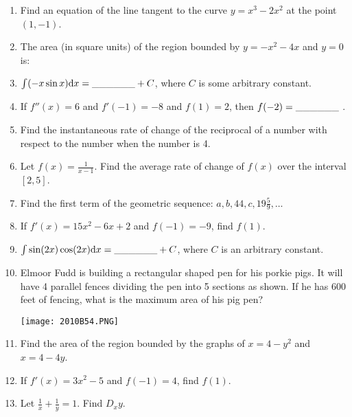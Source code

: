 \documentclass[../uilmath.tex]{subfiles}
\begin{document}
\begin{enumerate}[label=\bfseries\arabic*.]
    \item %
    Find an equation of the line tangent to the curve $y=x^3-2x^2$ at the point $(1,-1)$.

    \item %
    The area (in square units) of the region bounded by $y=-x^2-4x$ and $y=0$ is: 

    \item %
    $\int (-x\sin x)\mathrm{d} x=\_\_\_\_\_\_ +C$, where $C$ is some arbitrary constant.

    \item %
    If $f''(x)=6$ and $f'(-1)=-8$ and $f(1)=2$, then $f(-2)=\_\_\_\_\_\_$ .

    \item %
    Find the instantaneous rate of change of the reciprocal of a number with respect to the number when the number is 4.

    \item %
    Let $f(x)=\frac{1}{x-1}$. Find the average rate of change of $f(x)$ over the interval $[2,5]$.

    \item %
    Find the first term of the geometric sequence: $a,b,44,c,19\frac{5}{9},\dots$

    \item %
    If $f'(x)=15x^2-6x+2$ and $f(-1)=-9$, find $f(1)$.

    \item %
    $\int \sin(2x)\cos(2x)\mathrm{d} x=\_\_\_\_\_\_ +C$, where $C$ is an arbitrary constant.

    \item %
    Elmoor Fudd is building a rectangular shaped pen for his porkie pigs. It will have 4 parallel fences dividing the pen into 5 sections as shown. If he has 600 feet of fencing, what is the maximum area of his pig pen?
    \begin{center}
        \texttt{[image: 2010B54.PNG]}
    \end{center}

    \item %
    Find the area of the region bounded by the graphs of $x=4-y^2$ and $x=4-4y$.

    \item %
    If $f'(x)=3x^2-5$ and $f(-1)=4$, find $f(1)$.

    \item %
    Let $\frac{1}{x}+\frac{1}{y}=1$. Find $D_x y$.


\end{enumerate}
\end{document}
